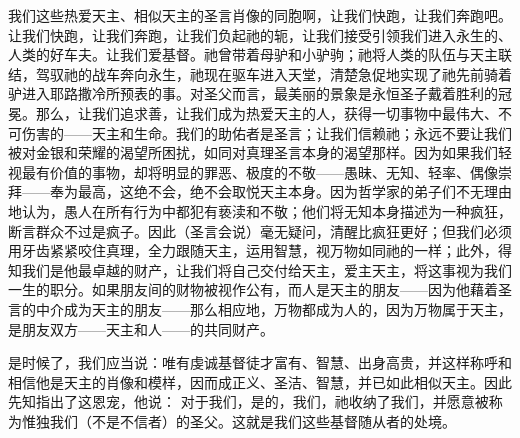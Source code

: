 \par

我们这些热爱天主、相似天主的圣言肖像的同胞啊，让我们快跑，让我们奔跑吧。让我们快跑，让我们奔跑，让我们负起祂的轭，让我们接受引领我们进入永生的、人类的好车夫。让我们爱基督。祂曾带着母驴和小驴驹；祂将人类的队伍与天主联结，驾驭祂的战车奔向永生，祂现在驱车进入天堂，清楚急促地实现了祂先前骑着驴进入耶路撒冷所预表的事。对圣父而言，最美丽的景象是永恒圣子戴着胜利的冠冕。那么，让我们追求善，让我们成为热爱天主的人，获得一切事物中最伟大、不可伤害的——天主和生命。我们的助佑者是圣言；让我们信赖祂；永远不要让我们被对金银和荣耀的渴望所困扰，如同对真理圣言本身的渴望那样。因为如果我们轻视最有价值的事物，却将明显的罪恶、极度的不敬——愚昧、无知、轻率、偶像崇拜——奉为最高，这绝不会，绝不会取悦天主本身。因为哲学家的弟子们不无理由地认为，愚人在所有行为中都犯有亵渎和不敬；他们将无知本身描述为一种疯狂，断言群众不过是疯子。因此（圣言会说）毫无疑问，清醒比疯狂更好；但我们必须用牙齿紧紧咬住真理，全力跟随天主，运用智慧，视万物如同祂的一样；此外，得知我们是他最卓越的财产，让我们将自己交付给天主，爱主天主，将这事视为我们一生的职分。如果朋友间的财物被视作公有，而人是天主的朋友——因为他藉着圣言的中介成为天主的朋友——那么相应地，万物都成为人的，因为万物属于天主，是朋友双方——天主和人——的共同财产。\par

是时候了，我们应当说：唯有虔诚基督徒才富有、智慧、出身高贵，并这样称呼和相信他是天主的肖像和模样，因而成正义、圣洁、智慧，并已如此相似天主。因此先知指出了这恩宠，他说： 对于我们，是的，我们，祂收纳了我们，并愿意被称为惟独我们（不是不信者）的圣父。这就是我们这些基督随从者的处境。\par

